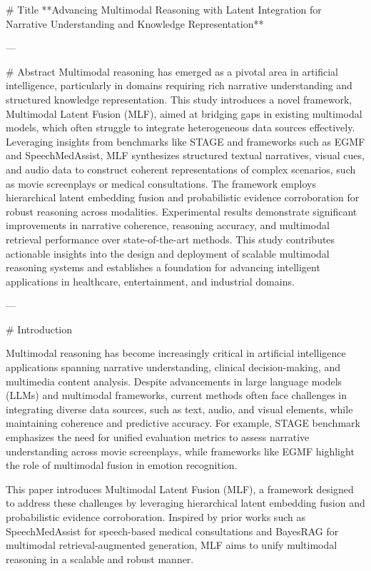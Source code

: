 # Title
**Advancing Multimodal Reasoning with Latent Integration for Narrative Understanding and Knowledge Representation**

---

# Abstract
Multimodal reasoning has emerged as a pivotal area in artificial intelligence, particularly in domains requiring rich narrative understanding and structured knowledge representation. This study introduces a novel framework, Multimodal Latent Fusion (MLF), aimed at bridging gaps in existing multimodal models, which often struggle to integrate heterogeneous data sources effectively. Leveraging insights from benchmarks like STAGE and frameworks such as EGMF and SpeechMedAssist, MLF synthesizes structured textual narratives, visual cues, and audio data to construct coherent representations of complex scenarios, such as movie screenplays or medical consultations. The framework employs hierarchical latent embedding fusion and probabilistic evidence corroboration for robust reasoning across modalities. Experimental results demonstrate significant improvements in narrative coherence, reasoning accuracy, and multimodal retrieval performance over state-of-the-art methods. This study contributes actionable insights into the design and deployment of scalable multimodal reasoning systems and establishes a foundation for advancing intelligent applications in healthcare, entertainment, and industrial domains.

---

# Introduction

Multimodal reasoning has become increasingly critical in artificial intelligence applications spanning narrative understanding, clinical decision-making, and multimedia content analysis. Despite advancements in large language models (LLMs) and multimodal frameworks, current methods often face challenges in integrating diverse data sources, such as text, audio, and visual elements, while maintaining coherence and predictive accuracy. For example, STAGE benchmark emphasizes the need for unified evaluation metrics to assess narrative understanding across movie screenplays, while frameworks like EGMF highlight the role of multimodal fusion in emotion recognition.

This paper introduces Multimodal Latent Fusion (MLF), a framework designed to address these challenges by leveraging hierarchical latent embedding fusion and probabilistic evidence corroboration. Inspired by prior works such as SpeechMedAssist for speech-based medical consultations and BayesRAG for multimodal retrieval-augmented generation, MLF aims to unify multimodal reasoning in a scalable and robust manner.

